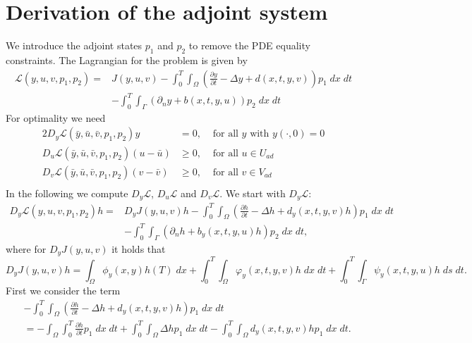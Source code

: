 \documentclass[
12pt, %
a4paper, %
onecolumn, %
portrait %
]{article}
\begin{document}
\section{Derivation of the adjoint system}
We introduce the adjoint states $p_1$ and $p_2$ to remove the PDE equality constraints. The Lagrangian for the problem is given by
\begin{align*}
\mathcal{L}(y,u,v,p_1, p_2) = & J(y,u,v) - \int_{0}^{T} \int_{\Omega} (\frac{\partial y}{\partial t} - \Delta y + d(x,t,y,v)) p_1 \; dx \; dt \\ & - \int_{0}^{T} \int_{\Gamma} (\partial_n y + b(x,t,y,u)) p_2 \; dx \; dt
\end{align*}
For optimality we need
\begin{alignat*}{2}
D_y \mathcal{L}(\bar{y},\bar{u},\bar{v},p_1, p_2) y & = 0, &\text{ for all } y \text{ with } y(\cdot, 0) = 0 \\
D_u \mathcal{L}(\bar{y},\bar{u},\bar{v},p_1, p_2) (u - \bar{u}) & \geq 0, &\text{ for all } u \in U_{ad} \\
D_v \mathcal{L}(\bar{y},\bar{u},\bar{v},p_1, p_2) (v - \bar{v}) & \geq 0, &\text{ for all } v \in V_{ad} \\
\end{alignat*}
In the following we compute $D_y \mathcal{L}$, $D_u \mathcal{L}$ and $D_v \mathcal{L}$. We start with $D_y \mathcal{L}$:
\begin{align*}
 D_y \mathcal{L}(y, u,v, p_1, p_2) h = & D_y J(y,u,v) h - \int_{0}^{T} \int_{\Omega} (\frac{\partial h}{\partial t} - \Delta h + d_y(x,t,y,v) h) p_1 \; dx \; dt \\ 
& - \int_{0}^{T} \int_{\Gamma} (\partial_n h + b_y(x,t,y,u) h) p_2 \; dx \; dt,
\end{align*} 
where for $D_y J(y,u,v)$ it holds that
\begin{equation}
D_y J(y,u,v) h = \int_{\Omega} \phi_y(x,y) h(T) \; dx + \int_{0}^{T} \int_{\Omega} \varphi_y(x,t,y, v) h \; dx \; dt 
+ \int_{0}^{T} \int_{\Gamma} \psi_y(x,t,y, u) h \; ds \; dt.
\end{equation}
First we consider the term
\begin{align*}
&- \int_{0}^{T} \int_{\Omega} (\frac{\partial h}{\partial t} - \Delta h + d_y(x,t,y,v) h) p_1 \; dx \; dt \\
& = - \int_{\Omega} \int_{0}^{T} \frac{\partial h}{\partial t} p_1 \; dx \; dt + \int_{0}^{T} \int_{\Omega} \Delta h p_1 \; dx \; dt - \int_{0}^{T} \int_{\Omega} d_y(x,t,y,v) h p_1 \; dx \; dt.
\end{align*}
\end{document}
